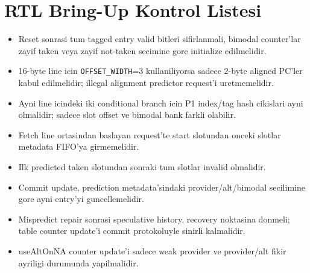 \documentclass[11pt,a4paper]{article}
\newcommand{\code}[1]{\texttt{#1}}
\begin{document}
\section{RTL Bring-Up Kontrol Listesi}

\begin{itemize}
\item Reset sonrasi tum tagged entry valid bitleri sifirlanmali, bimodal
counter'lar zayif taken veya zayif not-taken secimine gore initialize
edilmelidir.
\item 16-byte line icin \code{OFFSET\_WIDTH}=3 kullaniliyorsa sadece 2-byte
aligned PC'ler kabul edilmelidir; illegal alignment predictor request'i
uretmemelidir.
\item Ayni line icindeki iki conditional branch icin P1 index/tag hash cikislari
ayni olmalidir; sadece slot offset ve bimodal bank farkli olabilir.
\item Fetch line ortasindan baslayan request'te start slotundan onceki slotlar
metadata FIFO'ya girmemelidir.
\item Ilk predicted taken slotundan sonraki tum slotlar invalid olmalidir.
\item Commit update, prediction metadata'sindaki provider/alt/bimodal
secilimine gore ayni entry'yi guncellemelidir.
\item Mispredict repair sonrasi speculative history, recovery noktasina
donmeli; table counter update'i commit protokoluyle sinirli kalmalidir.
\item useAltOnNA counter update'i sadece weak provider ve provider/alt fikir
ayriligi durumunda yapilmalidir.
\end{itemize}
\end{document}
